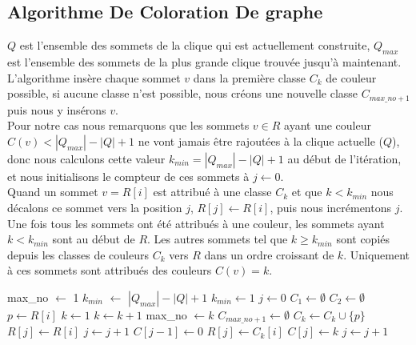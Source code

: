 \documentclass{article}
\begin{document}
\subsection{Algorithme De Coloration De graphe}
$Q$ est l'ensemble des sommets de la clique qui est actuellement construite, $Q_{max}$
est l'ensemble des sommets de la plus grande clique trouvée jusqu'à maintenant.\\
L'algorithme insère chaque sommet $v$ dans la première classe $C_k$ de couleur possible, si aucune
classe n'est possible, nous créons une nouvelle classe $C_{max\_no+1}$ puis nous y insérons $v$.\\
Pour notre cas nous remarquons que les sommets $ v \in R$ ayant une couleur $C(v) < |Q_{max}|-|Q|+1$
ne vont jamais être rajoutées à la clique actuelle ($Q$), donc nous calculons cette valeur
$k_{min}=|Q_{max}|-|Q|+1$ au début de l'itération, et nous initialisons le compteur de ces sommets à
$j \gets 0$.\\
Quand un sommet $v=R[i]$ est attribué à une classe $C_k$ et que $k<k_{min}$ nous décalons ce sommet
vers la position $j$, $R[j] \gets R[i]$, puis nous incrémentons $j$. \\
Une fois tous les sommets ont été attribués à une couleur, les sommets ayant $k<k_{min}$ sont au début
de $R$. Les autres sommets tel que $k \geq k_{min}$ sont copiés depuis les classes de couleurs $C_k$
vers $R$ dans un ordre croissant de $k$. Uniquement à ces sommets sont attribués des couleurs $C(v)=k$.
\newpage
\begin{algorithm}
\begin{algorithmic}
  \State max\_no $\gets$ 1
  \State $k_{min}$ $\gets$ $|Q_{max}| - |Q|+1$
    \State $k_{min} \gets 1$
  \EndIf
  \State $j \gets 0$
  \State $C_1 \gets \emptyset$ $C_2 \gets \emptyset$
    \State $p \gets R[i]$
    \State $k \gets 1$
      \State $k \gets k+1$
    \EndWhile
      \State max\_no $\gets k$
      \State $C_{max\_no+1} \gets \emptyset $
    \EndIf
    \State $C_k \gets C_k \cup \{p\}$
      \State $R[j] \gets R[i]$
      \State $j \gets j+1$
    \EndIf
  \EndFor
  \State $C[j-1] \gets 0$
      \State $R[j] \gets C_k[i]$
      \State $C[j] \gets k$
      \State $j \gets j+1$
    \EndFor
  \EndFor
\EndProcedure
\end{algorithmic}
\end{algorithm}
\end{document}
